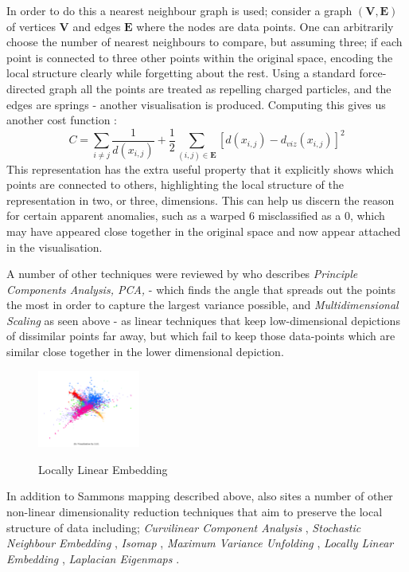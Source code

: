 \documentclass[a4paper,11pt,titlepage]{article}
\begin{document}
		\par 
		In order to do this a nearest neighbour graph is used; consider a graph $ ( \bm{V}, \bm{E}) $ of vertices $ \bm{V} $ and edges $ \bm{E} $ where the nodes are data points. One can arbitrarily choose the number of nearest neighbours to compare, but assuming three; if each point is connected to three other points within the original space, encoding the local structure clearly while forgetting about the rest. Using a standard force-directed graph all the points are treated as repelling charged particles, and the edges are springs - another visualisation is produced. Computing this gives us another cost function \cite{Olah2014b}:
		$$
			C = 
			\sum\limits_{i \neq j}
			\frac{1}{d(x_{i,j})} + 
			\frac{1}{2}
			\sum\limits_{ (i,j) \in \bm{E} } [ d(x_{i,j}) - d_{viz}(x_{i,j}) ]^2
		$$
		This representation has the extra useful property that it explicitly shows which points are connected to others, highlighting the local structure of the representation in two, or three, dimensions. This can help us discern the reason for certain apparent anomalies, such as a warped 6 misclassified as a 0, which may have appeared close together in the original space and now appear attached in the visualisation.			
		\par 
		A number of other techniques were reviewed by \cite{VanderMaaten2009} who describes \textit{Principle Components Analysis, PCA,} \cite{Hotelling33} - which finds the angle that spreads out the points the most in order to capture the largest variance possible, and \textit{Multidimensional Scaling} as seen above - as linear techniques that keep low-dimensional depictions of dissimilar points far away, but which fail to keep those data-points which are similar close together in the lower dimensional depiction.
 		
 	\begin{figure}[H]
    			\centering	
			{{\includegraphics[width=0.3\textwidth]
    				{img/hinton_lle.png} 
    			}}%
    			\caption{Locally Linear Embedding}%
    		\label{fig:3nn}
	\end{figure}	 
 		
		\par 
		In addition to Sammons mapping described above, \cite{VanderMaaten2009} also sites a number of other non-linear dimensionality reduction techniques that aim to preserve the local structure of data including; \textit{Curvilinear Component Analysis} \cite{Demartines1995}, \textit{Stochastic Neighbour Embedding} \cite{Hinton2002}, \textit{Isomap} \cite{Tenenbaum2000}, \textit{Maximum Variance Unfolding} \cite{Weinberger2004}, \textit{Locally Linear Embedding} \cite{Roweis2000}, \textit{Laplacian Eigenmaps} \cite{Belkin2002}.
\end{document}
